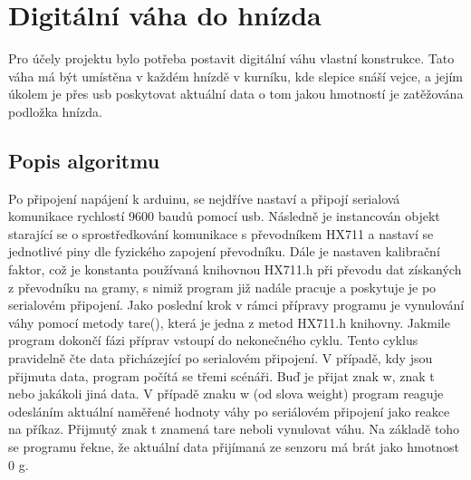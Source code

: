 \section{Digitální váha do hnízda}\label{sec:digitalni-vaha-do-hnizda}
Pro účely projektu bylo potřeba postavit digitální váhu vlastní konstrukce.
Tato váha má být umístěna v každém hnízdě v kurníku, kde slepice snáší vejce, a jejím úkolem je přes usb poskytovat aktuální data o tom jakou hmotností je zatěžována podložka hnízda.

\subsection*{Popis algoritmu}
Po připojení napájení k arduinu, se nejdříve nastaví a připojí serialová komunikace rychlostí 9600 baudů pomocí usb.
Následně je instancován objekt starající se o sprostředkování komunikace s převodníkem HX711 a nastaví se jednotlivé piny dle fyzického zapojení převodníku.
Dále je nastaven kalibrační faktor, což je konstanta používaná knihovnou HX711.h při převodu dat získaných z převodníku na gramy, s nimiž program již nadále pracuje a poskytuje je po serialovém připojení.
Jako poslední krok v rámci přípravy programu je vynulování váhy pomocí metody tare(), která je jedna z metod HX711.h knihovny.
Jakmile program dokončí fázi příprav vstoupí do nekonečného cyklu.
Tento cyklus pravidelně čte data přicházející po serialovém připojení.
V případě, kdy jsou přijmuta data, program počítá se třemi scénáři.
Buď je přijat znak w, znak t nebo jakákoli jiná data.
V případě znaku w (od slova weight) program reaguje odesláním aktuální naměřené hodnoty váhy po seriálovém připojení jako reakce na příkaz.
Přijmutý znak t znamená tare neboli vynulovat váhu.
Na základě toho se programu řekne, že aktuální data přijímaná ze senzoru má brát jako hmotnost 0 g.


